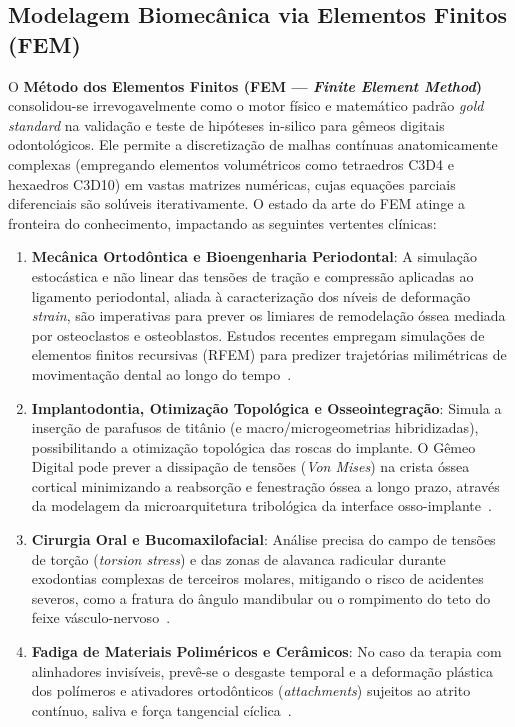 \subsection{Modelagem Biomecânica via Elementos Finitos (FEM)}

O \textbf{Método dos Elementos Finitos (FEM --- \textit{Finite Element Method})} consolidou-se irrevogavelmente como o motor físico e matemático padrão \textit{gold standard} na validação e teste de hipóteses in-silico para gêmeos digitais odontológicos. Ele permite a discretização de malhas contínuas anatomicamente complexas (empregando elementos volumétricos como tetraedros C3D4 e hexaedros C3D10) em vastas matrizes numéricas, cujas equações parciais diferenciais são solúveis iterativamente. O estado da arte do FEM atinge a fronteira do conhecimento, impactando as seguintes vertentes clínicas:

\begin{enumerate}
    \item \textbf{Mecânica Ortodôntica e Bioengenharia Periodontal}: A simulação estocástica e não linear das tensões de tração e compressão aplicadas ao ligamento periodontal, aliada à caracterização dos níveis de deformação \textit{strain}, são imperativas para prever os limiares de remodelação óssea mediada por osteoclastos e osteoblastos. Estudos recentes empregam simulações de elementos finitos recursivas (RFEM) para predizer trajetórias milimétricas de movimentação dental ao longo do tempo~\cite{zhang2024recursive}.
    \item \textbf{Implantodontia, Otimização Topológica e Osseointegração}: Simula a inserção de parafusos de titânio (e macro/microgeometrias hibridizadas), possibilitando a otimização topológica das roscas do implante. O Gêmeo Digital pode prever a dissipação de tensões (\textit{Von Mises}) na crista óssea cortical minimizando a reabsorção e fenestração óssea a longo prazo, através da modelagem da microarquitetura tribológica da interface osso-implante~\cite{alshadidi2024surface}.
    \item \textbf{Cirurgia Oral e Bucomaxilofacial}: Análise precisa do campo de tensões de torção (\textit{torsion stress}) e das zonas de alavanca radicular durante exodontias complexas de terceiros molares, mitigando o risco de acidentes severos, como a fratura do ângulo mandibular ou o rompimento do teto do feixe vásculo-nervoso~\cite{xing2024clinical}.
    \item \textbf{Fadiga de Materiais Poliméricos e Cerâmicos}: No caso da terapia com alinhadores invisíveis, prevê-se o desgaste temporal e a deformação plástica dos polímeros e ativadores ortodônticos (\textit{attachments}) sujeitos ao atrito contínuo, saliva e força tangencial cíclica~\cite{li2025impacts}.
\end{enumerate}

